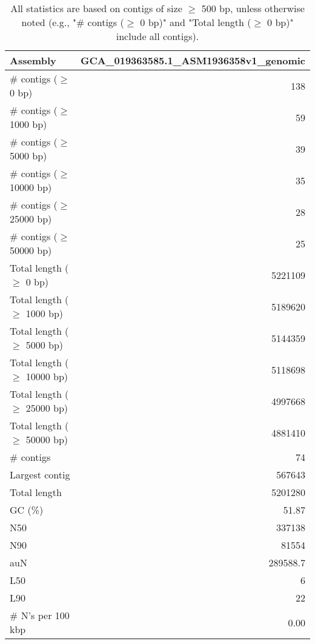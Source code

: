 \documentclass[12pt,a4paper]{article}
\begin{document}
\begin{table}[ht]
\begin{center}
\caption{All statistics are based on contigs of size $\geq$ 500 bp, unless otherwise noted (e.g., "\# contigs ($\geq$ 0 bp)" and "Total length ($\geq$ 0 bp)" include all contigs).}
\begin{tabular}{|l*{1}{|r}|}
\hline
Assembly & GCA\_019363585.1\_ASM1936358v1\_genomic \\ \hline
\# contigs ($\geq$ 0 bp) & 138 \\ \hline
\# contigs ($\geq$ 1000 bp) & 59 \\ \hline
\# contigs ($\geq$ 5000 bp) & 39 \\ \hline
\# contigs ($\geq$ 10000 bp) & 35 \\ \hline
\# contigs ($\geq$ 25000 bp) & 28 \\ \hline
\# contigs ($\geq$ 50000 bp) & 25 \\ \hline
Total length ($\geq$ 0 bp) & 5221109 \\ \hline
Total length ($\geq$ 1000 bp) & 5189620 \\ \hline
Total length ($\geq$ 5000 bp) & 5144359 \\ \hline
Total length ($\geq$ 10000 bp) & 5118698 \\ \hline
Total length ($\geq$ 25000 bp) & 4997668 \\ \hline
Total length ($\geq$ 50000 bp) & 4881410 \\ \hline
\# contigs & 74 \\ \hline
Largest contig & 567643 \\ \hline
Total length & 5201280 \\ \hline
GC (\%) & 51.87 \\ \hline
N50 & 337138 \\ \hline
N90 & 81554 \\ \hline
auN & 289588.7 \\ \hline
L50 & 6 \\ \hline
L90 & 22 \\ \hline
\# N's per 100 kbp & 0.00 \\ \hline
\end{tabular}
\end{center}
\end{table}
\end{document}
